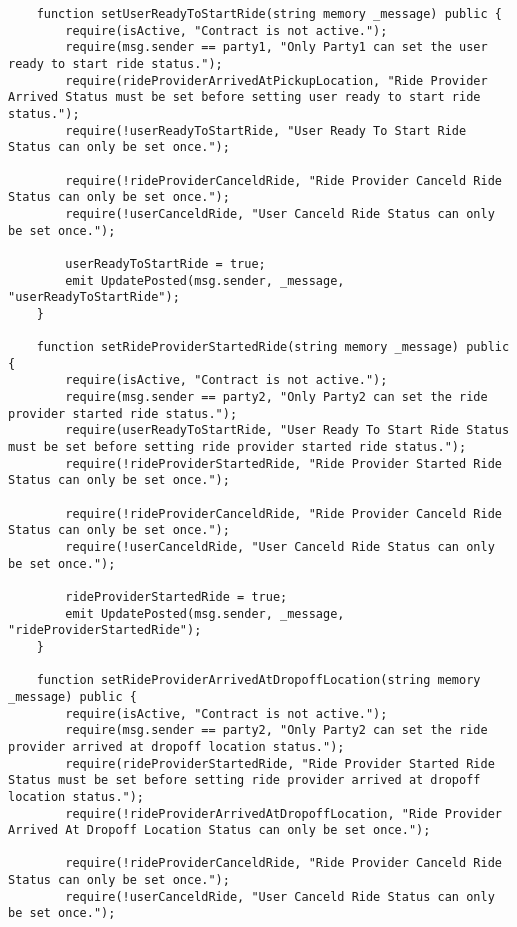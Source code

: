 \begin{lstlisting}
    function setUserReadyToStartRide(string memory _message) public {
        require(isActive, "Contract is not active.");
        require(msg.sender == party1, "Only Party1 can set the user ready to start ride status.");
        require(rideProviderArrivedAtPickupLocation, "Ride Provider Arrived Status must be set before setting user ready to start ride status.");
        require(!userReadyToStartRide, "User Ready To Start Ride Status can only be set once.");

        require(!rideProviderCanceldRide, "Ride Provider Canceld Ride Status can only be set once.");
        require(!userCanceldRide, "User Canceld Ride Status can only be set once.");

        userReadyToStartRide = true;
        emit UpdatePosted(msg.sender, _message, "userReadyToStartRide");
    }

    function setRideProviderStartedRide(string memory _message) public {
        require(isActive, "Contract is not active.");
        require(msg.sender == party2, "Only Party2 can set the ride provider started ride status.");
        require(userReadyToStartRide, "User Ready To Start Ride Status must be set before setting ride provider started ride status.");
        require(!rideProviderStartedRide, "Ride Provider Started Ride Status can only be set once.");

        require(!rideProviderCanceldRide, "Ride Provider Canceld Ride Status can only be set once.");
        require(!userCanceldRide, "User Canceld Ride Status can only be set once.");

        rideProviderStartedRide = true;
        emit UpdatePosted(msg.sender, _message, "rideProviderStartedRide");
    }

    function setRideProviderArrivedAtDropoffLocation(string memory _message) public {
        require(isActive, "Contract is not active.");
        require(msg.sender == party2, "Only Party2 can set the ride provider arrived at dropoff location status.");
        require(rideProviderStartedRide, "Ride Provider Started Ride Status must be set before setting ride provider arrived at dropoff location status.");
        require(!rideProviderArrivedAtDropoffLocation, "Ride Provider Arrived At Dropoff Location Status can only be set once.");

        require(!rideProviderCanceldRide, "Ride Provider Canceld Ride Status can only be set once.");
        require(!userCanceldRide, "User Canceld Ride Status can only be set once.");


\end{lstlisting}
